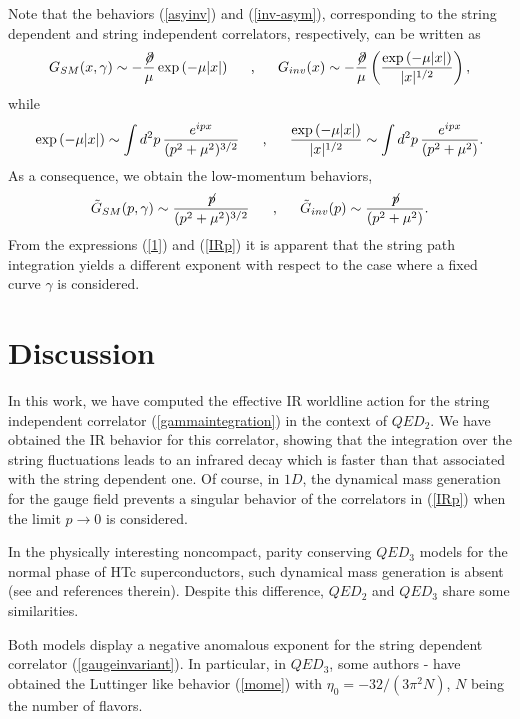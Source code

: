 \documentclass[a4paper,12pt]{article}
\begin{document}
Note that the behaviors (\ref{asyinv}) and (\ref{inv-asym}), corresponding to 
the string dependent and string independent correlators, respectively, can be written as
\begin{equation}
G_{SM}(x,\gamma)\sim -\frac{\not\! \partial}{\mu} \exp {(-\mu |x|)}
\makebox[.5in]{,}
G_{inv}(x)\sim-\frac{\not\! \partial}{\mu} \left(\frac{\exp {(-\mu |x|)}}{|x|^{1/2}}\right),
\label{1}
\end{equation}
while
\begin{equation}
\exp {(-\mu |x|)}\sim \int d^2p\,\frac{e^{ipx}}{(p^2+\mu^2)^{3/2}}
\makebox[.5in]{,}
\frac{\exp {(-\mu |x|)}}{|x|^{1/2}}
\sim \int d^2p\,\frac{ e^{ipx}}{(p^2+\mu^2)}.
\end{equation}
As a consequence, we obtain the low-momentum behaviors,
\begin{equation}
\tilde{G}_{SM}(p,\gamma)\sim \frac{\not\! p}{(p^2+\mu^2)^{3/2}}
 \makebox[.5in]{,}
\tilde{G}_{inv}(p)\sim \frac{\not\! p}{(p^2+\mu^2)}.
\label{IRp}
\end{equation}
From the expressions (\ref{1}) and (\ref{IRp}) it is apparent that the string path integration  yields a different exponent with respect to the case where a fixed curve $\gamma$ is considered.   


\section{Discussion}

In this work, we have computed the effective IR worldline action for the string independent correlator (\ref{gammaintegration}) in the context of $QED_2$. We have 
obtained the IR behavior for this correlator, showing that the integration over the string fluctuations leads to an infrared decay which is faster than that associated with the string dependent one. Of course, in $1D$, the dynamical mass generation for the gauge field prevents a singular behavior of the correlators in (\ref{IRp}) when the limit $p\to 0$ is considered.

In the physically interesting noncompact, parity conserving $QED_3$ models for the normal phase of HTc superconductors, such dynamical mass generation is absent (see \cite{ftv1} and references therein). 
Despite this difference, $QED_2$ and $QED_3$ share some similarities.

Both models display a negative anomalous exponent for the string dependent correlator (\ref{gaugeinvariant}). In particular, in $QED_3$, some authors \cite{rw2}-\cite{gkr} have obtained the Luttinger like behavior (\ref{mome}) with $\eta_0=-32/(3\pi^2N)$,  $N$ being the number of flavors.
\end{document}
